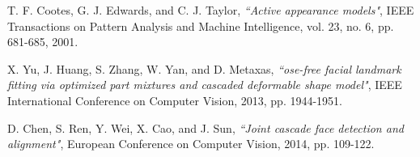 T. F. Cootes, G. J. Edwards, and C. J. Taylor,
\textit{``Active appearance models"}, IEEE Transactions on Pattern Analysis and Machine Intelligence, vol. 23, no. 6, pp. 681-685, 2001.

X. Yu, J. Huang, S. Zhang, W. Yan, and D. Metaxas,
\textit{``ose-free facial landmark fitting via optimized part mixtures and cascaded deformable
shape model"}, IEEE International Conference on Computer Vision, 2013, pp. 1944-1951.

D. Chen, S. Ren, Y. Wei, X. Cao, and J. Sun,
\textit{``Joint cascade face detection and alignment"}, European Conference on Computer Vision, 2014, pp. 109-122.